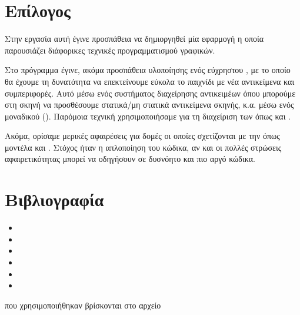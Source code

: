 \documentclass[11pt]{scrartcl} %
\begin{document}
\section{Επίλογος}

Στην εργασία αυτή έγινε προσπάθεια να δημιοργηθεί μία εφαρμογή 
η οποία παρουσιάζει διάφορικες τεχνικές προγραμματισμού γραφικών. 

Στο πρόγραμμα έγινε, ακόμα προσπάθεια υλοποίησης ενός εύχρηστου 
, με το οποίο θα έχουμε τη δυνατότητα να επεκτείνουμε εύκολα
το παιχνίδι με νέα αντικείμενα και συμπεριφορές. Αυτό μέσω 
ενός συστήματος διαχείρησης αντικειμέων όπου μπορούμε στη σκηνή 
να προσθέσουμε στατικά/μη στατικά αντικείμενα σκηνής,  κ.α. 
μέσω ενός μοναδικού  (). Παρόμοια τεχνική χρησιμοποιήσαμε για 
τη διαχείριση των  όπως  και .

Ακόμα, ορίσαμε μερικές αφαιρέσεις για δομές οι οποίες σχετίζονται με
την  όπως μοντέλα και . 
Στόχος ήταν η απλοποίηση του κώδικα, αν και οι πολλές στρώσεις 
αφαιρετικότητας μπορεί να οδηγήσουν σε δυσνόητο και πιο αργό κώδικα.

\section{Βιβλιογραφία}
\tiny
\begin{itemize}
    \item {}
    \item {}
    \item {}
    \item {}
    \item {}
    \item {}
\end{itemize}
     που χρησιμοποιήθηκαν βρίσκονται στο αρχείο 
\end{document}
